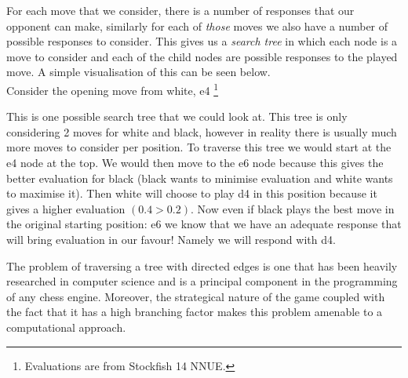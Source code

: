 For each move that we consider, there is a number of 
responses that our opponent can make, similarly for each of 
\textit{those} moves we also have a number of possible 
responses to consider. This gives us a \textit{search tree}
in which each node is a move to consider and each of the 
child nodes are possible responses to the played move. A 
simple visualisation of this can be seen below.\\

Consider the opening move from white, e4
\footnote{Evaluations are from Stockfish 14 NNUE.}

\begin{center}
\end{center}

This is one possible search tree that we could look at. This
tree is only considering 2 moves for white and black, 
however in reality there is usually much more moves to 
consider per position. To traverse this tree we would start
at the e4 node at the top. We would then move to the e6 node
because this gives the better evaluation for black (black 
wants to minimise evaluation and white wants to maximise it).
Then white will choose to play d4 in this position because
it gives a higher evaluation $(0.4>0.2)$. Now even if black 
plays the best move in the original starting position: e6 
we know that we have an adequate response that will bring 
evaluation in our favour! Namely we will respond with d4.

The problem of traversing a tree with directed edges is one
that has been heavily researched in computer science and is 
a principal component in the programming of any chess engine.
Moreover, the strategical nature of the game coupled 
with the fact that it has a high branching factor makes this
problem amenable to a computational approach.


